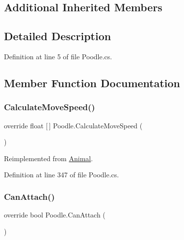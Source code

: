 \subsection*{Additional Inherited Members}


\subsection{Detailed Description}


Definition at line 5 of file Poodle.\+cs.



\subsection{Member Function Documentation}
\mbox{\label{class_poodle_afded59108342a9d5c41b91305911752b}} 
\subsubsection{\texorpdfstring{Calculate\+Move\+Speed()}{CalculateMoveSpeed()}}
{\footnotesize\ttfamily override float \mbox{[}$\,$\mbox{]} Poodle.\+Calculate\+Move\+Speed (\begin{DoxyParamCaption}{ }\end{DoxyParamCaption})\hspace{0.3cm}{\ttfamily [virtual]}}



Reimplemented from \mbox{\hyperlink{class_animal_ad1033798d72c010a822937be75c5bdde}{Animal}}.



Definition at line 347 of file Poodle.\+cs.

\mbox{\label{class_poodle_a1176b4dc1a07c88c75498f4fc80aba4a}} 
\subsubsection{\texorpdfstring{Can\+Attach()}{CanAttach()}}
{\footnotesize\ttfamily override bool Poodle.\+Can\+Attach (\begin{DoxyParamCaption}{ }\end{DoxyParamCaption})\hspace{0.3cm}{\ttfamily [virtual]}}



